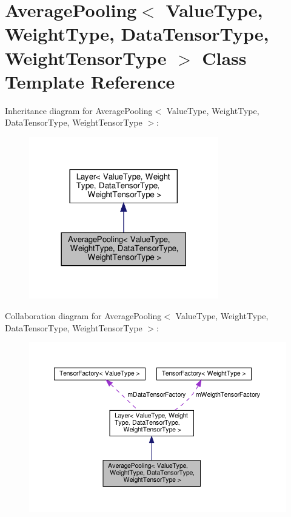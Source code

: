 \hypertarget{classAveragePooling}{}\section{Average\+Pooling$<$ Value\+Type, Weight\+Type, Data\+Tensor\+Type, Weight\+Tensor\+Type $>$ Class Template Reference}
\label{classAveragePooling}


Inheritance diagram for Average\+Pooling$<$ Value\+Type, Weight\+Type, Data\+Tensor\+Type, Weight\+Tensor\+Type $>$\+:
\nopagebreak
\begin{figure}[H]
\begin{center}
\leavevmode
\includegraphics[width=234pt]{classAveragePooling__inherit__graph}
\end{center}
\end{figure}


Collaboration diagram for Average\+Pooling$<$ Value\+Type, Weight\+Type, Data\+Tensor\+Type, Weight\+Tensor\+Type $>$\+:
\nopagebreak
\begin{figure}[H]
\begin{center}
\leavevmode
\includegraphics[width=350pt]{classAveragePooling__coll__graph}
\end{center}
\end{figure}
